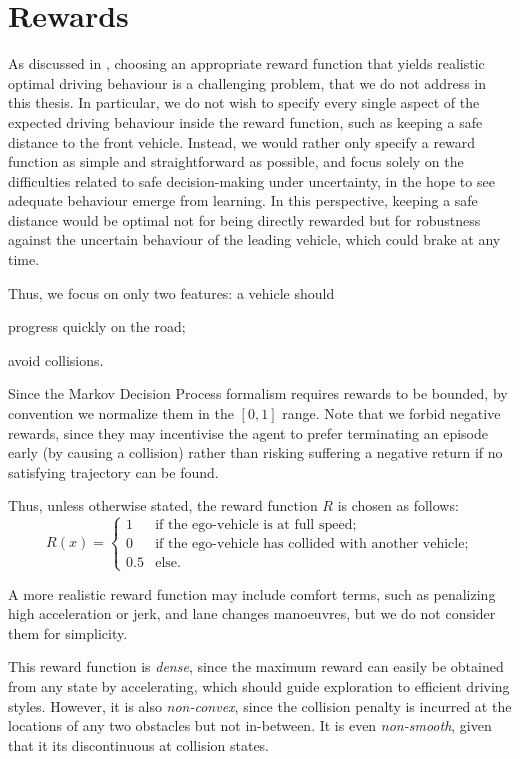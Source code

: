 \section{Rewards}

As discussed in , choosing an appropriate reward function that yields realistic optimal driving behaviour is a challenging problem, that we do not address in this thesis. In particular, we do not wish to specify every single aspect of the expected driving behaviour inside the reward function, such as keeping a safe distance to the front vehicle. Instead, we would rather only specify a reward function as simple and straightforward as possible, and focus solely on the difficulties related to safe decision-making under uncertainty, in the hope to see adequate behaviour emerge from learning. In this perspective, keeping a safe distance would be optimal not for being directly rewarded but for robustness against the uncertain behaviour of the leading vehicle, which could brake at any time.

Thus, we focus on only two features: a vehicle should
\begin{enumerate*}[label=(\roman*)]
	\item progress quickly on the road;
	\item avoid collisions.
\end{enumerate*}

Since the Markov Decision Process formalism requires rewards to be bounded, by convention we normalize them in the $[0, 1]$ range.
Note that we forbid negative rewards, since they may incentivise the agent to prefer terminating an episode early (by causing a collision) rather than risking suffering a negative return if no satisfying trajectory can be found.

Thus, unless otherwise stated, the reward function $R$ is chosen as follows:
\[
R(x) = 
\begin{cases}
1 & \text{if the ego-vehicle is at full speed;}\\
0 & \text{if the ego-vehicle has collided with another vehicle;}\\
0.5 & \text{else.}
\end{cases}\]

A more realistic reward function may include comfort terms, such as penalizing high acceleration or jerk, and lane changes manoeuvres, but we do not consider them for simplicity.

This reward function is \emph{dense}, since the maximum reward can easily be obtained from any state by accelerating, which should guide exploration to efficient driving styles. However, it is also \emph{non-convex}, since \eg the collision penalty is incurred at the locations of any two obstacles but not in-between. It is even \emph{non-smooth}, given that it its discontinuous at collision states.

